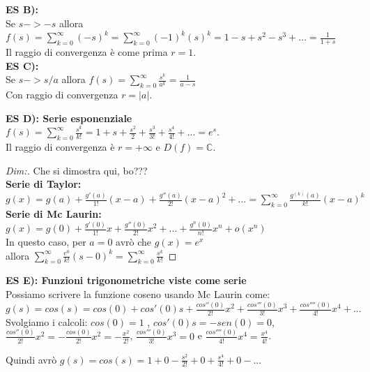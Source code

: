 \textbf{ES B):}\\
Se $ s -> -s$ allora $ f(s) = \sum_{k=0}^\infty (-s)^{k} = \sum_{k=0}^\infty (-1)^{k} (s)^k = 1 -s + s^2 - s^3 +...= \frac{1}{1+s}$\\
Il raggio di convergenza è come prima $r=1$.\\

\textbf{ES C):}\\
Se $ s -> s/a$ allora $ f(s) = \sum_{k=0}^\infty \frac{s^k}{a^k} = \frac{1}{a-s}$\\
Con raggio di convergenza $ r = |a|$.

\textbf{ES D): Serie esponenziale}\\
$ f(s) = \sum_{k=0}^\infty \frac{s^{k}}{k!} = 1 +s + \frac{s^2}{2} + \frac{s^3}{3!} + \frac{s^4}{4!}+...= e^{s}$.\\
Il raggio di convergenza è $ r = +\infty$ e $ D(f)= \mathbb{C}$.\\

\begin{proof}[Dim:] Che si dimostra qui, bo???\\
	\textbf{Serie di Taylor:}\\
	$ g(x) = g(a) + \frac{ g'(a)}{1!} (x-a) + \frac{ g''(a)}{2!} (x-a)^2 +... =  \sum_{k=0}^\infty \frac{ g^{(k)}(a) }{k!} (x-a)^k$\\
	\textbf{Serie di Mc Laurin:} $ g(x) = g(0) + \frac{ g'(0)}{1!} x + \frac{ g''(0)}{2!} x^2+... + \frac{ g^{n}(0)}{n!} x^n+ o(x^n)$ \\
	In questo caso, per $ a=0$ avrò che $ g(x) = e^x $\\ 
	allora $ \sum_{k=0}^\infty \frac{ e^0 }{k!} (s-0)^k = \sum_{k=0}^\infty \frac{ s^k }{k!} $
\end{proof}


\textbf{ES E): Funzioni trigonometriche viste come serie}\\
Possiamo scrivere la funzione coseno usando Mc Laurin come:\\
$ g(s) = cos(s) = cos(0) + cos'(0)s + \frac{ cos''(0)}{2!} x^2 + \frac{ cos'''(0)}{3!} x^3 + \frac{ cos''''(0)}{4!} x^4 + ... $\\

Svolgiamo i calcoli: $ cos(0) = 1$ , $ cos'(0)s = -sen(0) = 0 $, $\frac{ cos''(0)}{2!} x^2 = - \frac{ cos(0)}{2!} x^2 = - \frac{ x^2}{2!}$, $ \frac{ cos'''(0)}{3!} x^3 = 0 $ e $ \frac{ cos''''(0)}{4!} x^4 = \frac{ x^4}{4!} $.

Quindi avrò $ g(s) = cos(s) = 1 + 0 - \frac{s^2}{2!} + 0 + \frac{s^4}{4!} + 0 -... $\\

